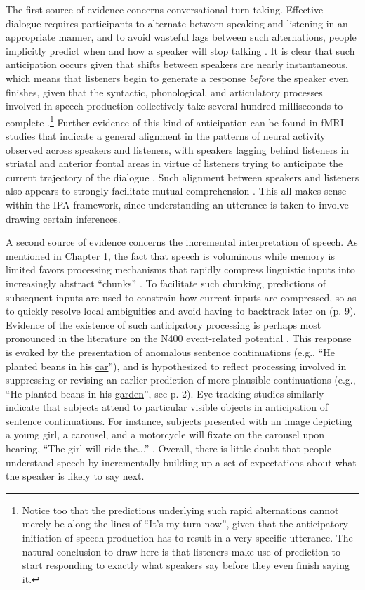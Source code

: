 The first source of evidence concerns conversational turn-taking. Effective dialogue requires participants to alternate between speaking and listening in an appropriate manner, and to avoid wasteful lags between such alternations, people implicitly predict when and how a speaker will stop talking \citep{Christiansen:2015,Pickering:2013}. It is clear that such anticipation occurs given that shifts between speakers are nearly instantaneous, which means that listeners begin to generate a response \textit{before} the speaker even finishes, given that the syntactic, phonological, and articulatory processes involved in speech production collectively take several hundred milliseconds to complete \citep{Pickering:2013}.\footnote{Notice too that the predictions underlying such rapid alternations cannot merely be along the lines of ``It's my turn now'', given that the anticipatory initiation of speech production has to result in a very specific utterance. The natural conclusion to draw here is that listeners make use of prediction to start responding to exactly what speakers say before they even finish saying it.} Further evidence of this kind of anticipation can be found in fMRI studies that indicate a general alignment in the patterns of neural activity observed across speakers and listeners, with speakers lagging behind listeners in striatal and anterior frontal areas in virtue of listeners trying to anticipate the current trajectory of the dialogue \citep[reviewed in][]{Christiansen:2015}.  Such alignment between speakers and listeners also appears to strongly facilitate mutual comprehension \citep{Pickering:2013,Christiansen:2015}. This all makes sense within the IPA framework, since understanding an utterance is taken to involve drawing certain inferences.

A second source of evidence concerns the incremental interpretation of speech. As mentioned in Chapter 1, the fact that speech is voluminous while memory is limited favors processing mechanisms that rapidly compress linguistic inputs into increasingly abstract ``chunks'' \citep{Christiansen:2015}. To facilitate such chunking, predictions of subsequent inputs are used to constrain how current inputs are compressed, so as to quickly resolve local ambiguities and avoid having to backtrack later on (p. 9). Evidence of the existence of such anticipatory processing is perhaps most pronounced in the literature on the N400 event-related potential \citep{Federmeier:2007,Kutas:2011}. This response is evoked by the presentation of anomalous sentence continuations (e.g., ``He planted beans in his \underline{car}''), and is hypothesized to reflect processing involved in suppressing or revising an earlier prediction of more plausible continuations (e.g., ``He planted beans in his \underline{garden}'', see p. 2). Eye-tracking studies similarly indicate that subjects attend to particular visible objects in anticipation of sentence continuations. For instance, subjects presented with an image depicting a young girl, a carousel, and a motorcycle will fixate on the carousel upon hearing, ``The girl will ride the...'' \citep[][p. 194]{Kutas:2009}. Overall, there is little doubt that people understand speech by incrementally building up a set of expectations about what the speaker is likely to say next. 

